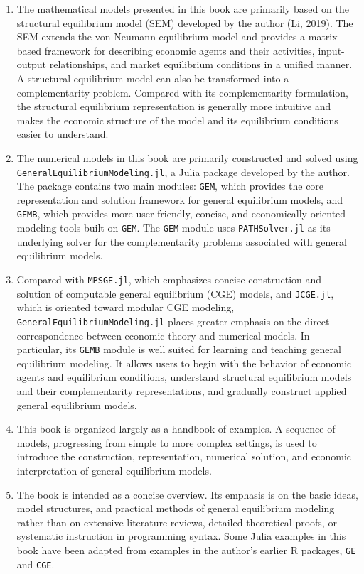 \documentclass[
  letterpaper,
  DIV=11,
  numbers=noendperiod]{scrreprt}
\begin{document}
\begin{enumerate}
\def\labelenumi{\arabic{enumi}.}
\item
  The mathematical models presented in this book are primarily based on
  the structural equilibrium model (SEM) developed by the author (Li,
  2019). The SEM extends the von Neumann equilibrium model and provides
  a matrix-based framework for describing economic agents and their
  activities, input-output relationships, and market equilibrium
  conditions in a unified manner. A structural equilibrium model can
  also be transformed into a complementarity problem. Compared with its
  complementarity formulation, the structural equilibrium representation
  is generally more intuitive and makes the economic structure of the
  model and its equilibrium conditions easier to understand.
\item
  The numerical models in this book are primarily constructed and solved
  using \texttt{GeneralEquilibriumModeling.jl}, a Julia package
  developed by the author. The package contains two main modules:
  \texttt{GEM}, which provides the core representation and solution
  framework for general equilibrium models, and \texttt{GEMB}, which
  provides more user-friendly, concise, and economically oriented
  modeling tools built on \texttt{GEM}. The \texttt{GEM} module uses
  \texttt{PATHSolver.jl} as its underlying solver for the
  complementarity problems associated with general equilibrium models.
\item
  Compared with \texttt{MPSGE.jl}, which emphasizes concise construction
  and solution of computable general equilibrium (CGE) models, and
  \texttt{JCGE.jl}, which is oriented toward modular CGE modeling,
  \texttt{GeneralEquilibriumModeling.jl} places greater emphasis on the
  direct correspondence between economic theory and numerical models. In
  particular, its \texttt{GEMB} module is well suited for learning and
  teaching general equilibrium modeling. It allows users to begin with
  the behavior of economic agents and equilibrium conditions, understand
  structural equilibrium models and their complementarity
  representations, and gradually construct applied general equilibrium
  models.
\item
  This book is organized largely as a handbook of examples. A sequence
  of models, progressing from simple to more complex settings, is used
  to introduce the construction, representation, numerical solution, and
  economic interpretation of general equilibrium models.
\item
  The book is intended as a concise overview. Its emphasis is on the
  basic ideas, model structures, and practical methods of general
  equilibrium modeling rather than on extensive literature reviews,
  detailed theoretical proofs, or systematic instruction in programming
  syntax. Some Julia examples in this book have been adapted from
  examples in the author's earlier R packages, \texttt{GE} and
  \texttt{CGE}.
\end{enumerate}
\end{document}
